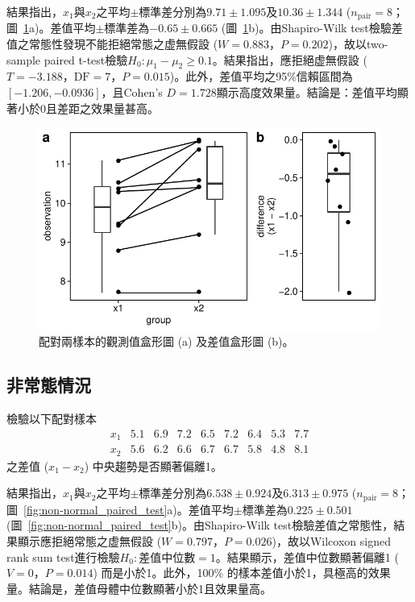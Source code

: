 \documentclass[12pt]{article}
\renewcommand{\figurename}{圖}
\newcommand*{\figref}[1]{\figurename~\ref{#1}}
\begin{document}
結果指出，$x_1$與$x_2$之平均$\pm$標準差分別為$9.71 \pm 1.095$及$10.36 \pm 1.344$ ($n_\mathrm{pair} = 8$；\figref{fig:normal_paired_test}a)。差值平均$\pm$標準差為$-0.65\pm0.665$  (\figref{fig:normal_paired_test}b)。由Shapiro-Wilk test檢驗差值之常態性發現不能拒絕常態之虚無假設 ($W = 0.883$，$P = 0.202$)，故以two-sample paired t-test檢驗$H_0: \mu_1 - \mu_2 \geq 0.1$。結果指出，應拒絕虚無假設 ($T = -3.188$，$\text{DF} = 7$，$P = 0.015$)。此外，差值平均之95\%信賴區間為$\left[-1.206, -0.0936\right]$，且Cohen's $D = 1.728$顯示高度效果量。結論是：差值平均顯著小於0且差距之效果量甚高。

\begin{figure}[htbp]
	\centering
	\includegraphics[]{normal_paired_test.pdf}
	\caption{配對兩樣本的觀測值盒形圖 (a) 及差值盒形圖 (b)。}
	\label{fig:normal_paired_test}
\end{figure}

\subsection{非常態情況}
檢驗以下配對樣本
\[
\begin{matrix}
x_1 & 5.1 & 6.9 & 7.2 & 6.5 & 7.2 & 6.4 & 5.3 & 7.7 \\
x_2 & 5.6 & 6.2 & 6.6 & 6.7 & 6.7 & 5.8 & 4.8 & 8.1
\end{matrix}
\]
之差值 ($x_1 - x_2$) 中央趨勢是否顯著偏離1。

結果指出，$x_1$與$x_2$之平均$\pm$標準差分別為$6.538 \pm 0.924$及$6.313 \pm 0.975$ ($n_\mathrm{pair} = 8$；\figref{fig:non-normal_paired_test}a)。差值平均$\pm$標準差為$0.225\pm0.501$ (\figref{fig:non-normal_paired_test}b)。由Shapiro-Wilk test檢驗差值之常態性，結果顯示應拒絕常態之虚無假設 ($W = 0.797$，$P = 0.026$)，故以Wilcoxon signed rank sum test進行檢驗$H_0: \text{差值中位數}=1$。結果顯示，差值中位數顯著偏離1 ($V = 0$，$P = 0.014$) 而是小於1。此外，100\% 的樣本差值小於1，具極高的效果量。結論是，差值母體中位數顯著小於1且效果量高。
\end{document}
